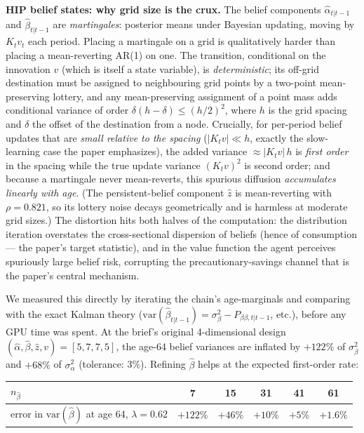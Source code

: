 \documentclass[11pt,fleqn]{article}
\begin{document}
\textbf{HIP belief states: why grid size is the crux.} The belief components
$\hat{\alpha}_{t|t-1}$ and $\hat{\beta}_{t|t-1}$ are \emph{martingales}: posterior
means under Bayesian updating, moving by $K_t v_t$ each period. Placing a martingale
on a grid is qualitatively harder than placing a mean-reverting AR(1) on one. The
transition, conditional on the innovation $v$ (which is itself a state variable), is
\emph{deterministic}; its off-grid destination must be assigned to neighbouring grid
points by a two-point mean-preserving lottery, and any mean-preserving assignment of
a point mass adds conditional variance of order
$\delta(h-\delta)\le(h/2)^2$, where $h$ is the grid spacing and $\delta$ the offset
of the destination from a node. Crucially, for per-period belief updates that are
\emph{small relative to the spacing} ($|K_tv|\ll h$, exactly the slow-learning case
the paper emphasizes), the added variance $\approx |K_t v|\,h$ is \emph{first order}
in the spacing while the true update variance $(K_tv)^2$ is second order; and because
a martingale never mean-reverts, this spurious diffusion \emph{accumulates linearly
with age}. (The persistent-belief component $\hat{z}$ is mean-reverting with
$\rho=0.821$, so its lottery noise decays geometrically and is harmless at moderate
grid sizes.) The distortion hits both halves of the computation: the distribution
iteration overstates the cross-sectional dispersion of beliefs (hence of consumption
--- the paper's target statistic), and in the value function the agent perceives
spuriously large belief risk, corrupting the precautionary-savings channel that is
the paper's central mechanism.

We measured this directly by iterating the chain's age-marginals and comparing with
the exact Kalman theory ($\mathrm{var}(\hat{\beta}_{t|t-1})
=\sigma^2_\beta-P_{\beta\beta,t|t-1}$, etc.), before any GPU time was spent.
At the brief's original 4-dimensional design
$(\hat{\alpha},\hat{\beta},\hat{z},v)=[5,7,7,5]$, the age-64 belief variances are
inflated by $+122\%$ of $\sigma^2_\beta$ and $+68\%$ of $\sigma^2_\alpha$
(tolerance: 3\%). Refining $\hat\beta$ helps at the expected first-order rate:

\begin{center}
\begin{tabular}{lccccc}
\toprule
$n_{\hat\beta}$ & 7 & 15 & 31 & 41 & 61 \\
\midrule
error in $\mathrm{var}(\hat\beta)$ at age 64, $\lambda=0.62$ &
$+122\%$ & $+46\%$ & $+10\%$ & $+5\%$ & $+1.6\%$ \\
\bottomrule
\end{tabular}
\end{center}
\end{document}
